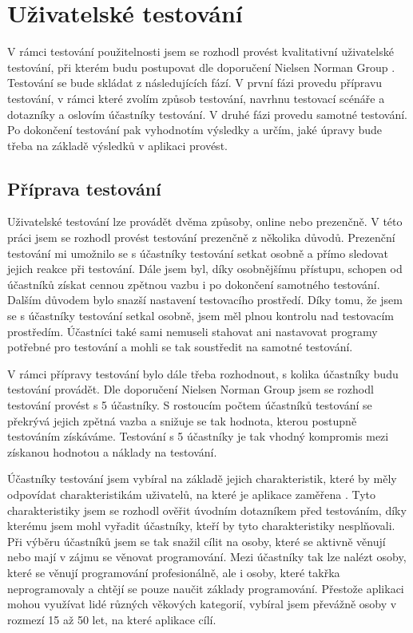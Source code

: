 \section{Uživatelské testování}

V rámci testování použitelnosti jsem se rozhodl provést kvalitativní uživatelské testování, při kterém budu postupovat dle doporučení Nielsen Norman Group \cite{UsabilityTesting}. Testování se bude skládat z následujících fází. V první fázi provedu přípravu testování, v rámci které zvolím způsob testování, navrhnu testovací scénáře a dotazníky a oslovím účastníky testování. V druhé fázi provedu samotné testování. Po dokončení testování pak vyhodnotím výsledky a určím, jaké úpravy bude třeba na základě výsledků v aplikaci provést.

\subsection{Příprava testování}

Uživatelské testování lze provádět dvěma způsoby, online nebo prezenčně. V této práci jsem se rozhodl provést testování prezenčně z několika důvodů. Prezenční testování mi umožnilo se s účastníky testování setkat osobně a přímo sledovat jejich reakce při testování. Dále jsem byl, díky osobnějšímu přístupu, schopen od účastníků získat cennou zpětnou vazbu i po dokončení samotného testování. Dalším důvodem bylo snazší nastavení testovacího prostředí. Díky tomu, že jsem se s účastníky testování setkal osobně, jsem měl plnou kontrolu nad testovacím prostředím. Účastníci také sami nemuseli stahovat ani nastavovat programy potřebné pro testování a mohli se tak soustředit na samotné testování.

V rámci přípravy testování bylo dále třeba rozhodnout, s kolika účastníky budu testování provádět. Dle doporučení Nielsen Norman Group jsem se rozhodl testování provést s 5 účastníky. S rostoucím počtem účastníků testování se překrývá jejich zpětná vazba a snižuje se tak hodnota, kterou postupně testováním získáváme. Testování s 5 účastníky je tak vhodný kompromis mezi získanou hodnotou a náklady na testování. \cite{WhyOnlyFiveUsers}

Účastníky testování jsem vybíral na základě jejich charakteristik, které by měly odpovídat charakteristikám uživatelů, na které je aplikace zaměřena \cite{UsabilityTesting}. Tyto charakteristiky jsem se rozhodl ověřit úvodním dotazníkem před testováním, díky kterému jsem mohl vyřadit účastníky, kteří by tyto charakteristiky nesplňovali. Při výběru účastníků jsem se tak snažil cílit na osoby, které se aktivně věnují nebo mají v zájmu se věnovat programování. Mezi účastníky tak lze nalézt osoby, které se věnují programování profesionálně, ale i osoby, které takřka neprogramovaly a chtějí se pouze naučit základy programování. Přestože aplikaci mohou využívat lidé různých věkových kategorií, vybíral jsem převážně osoby v rozmezí 15 až 50 let, na které aplikace cílí.

